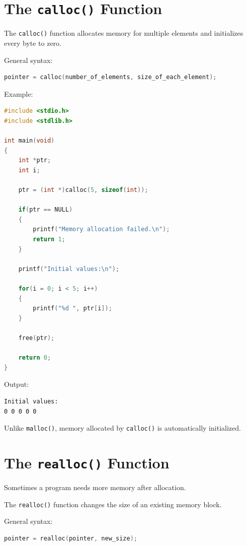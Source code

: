 \documentclass[12pt,openany]{book}
\begin{document}
\section{The \texttt{calloc()} Function}

The \texttt{calloc()} function allocates memory for multiple elements and initializes every byte to zero.

General syntax:

\begin{lstlisting}[language=C]
pointer = calloc(number_of_elements, size_of_each_element);
\end{lstlisting}

Example:

\begin{lstlisting}[language=C]
#include <stdio.h>
#include <stdlib.h>

int main(void)
{
    int *ptr;
    int i;

    ptr = (int *)calloc(5, sizeof(int));

    if(ptr == NULL)
    {
        printf("Memory allocation failed.\n");
        return 1;
    }

    printf("Initial values:\n");

    for(i = 0; i < 5; i++)
    {
        printf("%d ", ptr[i]);
    }

    free(ptr);

    return 0;
}
\end{lstlisting}

Output:

\begin{lstlisting}
Initial values:
0 0 0 0 0
\end{lstlisting}

Unlike \texttt{malloc()}, memory allocated by \texttt{calloc()} is automatically initialized.

\section{The \texttt{realloc()} Function}

Sometimes a program needs more memory after allocation.

The \texttt{realloc()} function changes the size of an existing memory block.

General syntax:

\begin{lstlisting}[language=C]
pointer = realloc(pointer, new_size);
\end{lstlisting}
\end{document}
